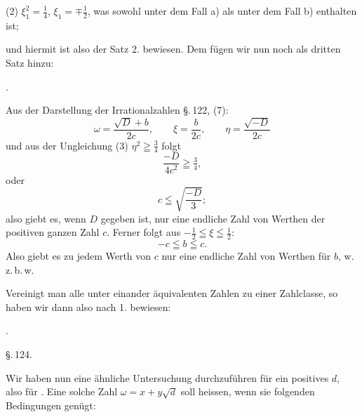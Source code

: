 

(2) $\xi_1^2 = \tfrac{1}{4}$, $\xi_1 = \mp\tfrac{1}{2}$, was sowohl unter dem Fall a) als unter dem
Fall b) enthalten ist;

und hiermit ist also der Satz 2. bewiesen. Dem fügen wir nun noch als
dritten Satz hinzu:

.\quad {}

Aus der Darstellung der Irrationalzahlen \S.\,122, (7):
\[
\omega = \dfrac{\sqrt{D}+b}{2c}, \qquad \xi = \dfrac{b}{2c}, \qquad \eta = \dfrac{\sqrt{-D}}{2c}
\]
und aus der Ungleichung (3) $\eta^2 \geqq \tfrac{3}{4}$ folgt
\[
\dfrac{-D}{4c^2} \geqq \tfrac{3}{4},
\]
oder
\[
c \leqq \sqrt{\dfrac{-D}{3}};
\]
also giebt es, wenn $D$ gegeben ist, nur eine endliche Zahl von Werthen
der positiven ganzen Zahl $c$. Ferner folgt aus $-\tfrac{1}{2} \leqq \xi \leqq \tfrac{1}{2}$:
\[
-c \leqq b \leqq c.
\]
Also giebt es zu jedem Werth von $c$ nur eine endliche Zahl von Werthen
für $b$, w.\,z.\,b.\,w.

Vereinigt man alle unter einander äquivalenten Zahlen zu einer
Zahlclasse, so haben wir dann also nach 1. bewiesen:

.\quad {}

\begin{center}
\S.\,124.

\end{center}

Wir haben nun eine ähnliche Untersuchung durchzuführen für ein
positives $d$, also für . Eine solche
Zahl $\omega = x + y\sqrt{d}$ soll  heissen, wenn sie folgenden
Bedingungen genügt:
